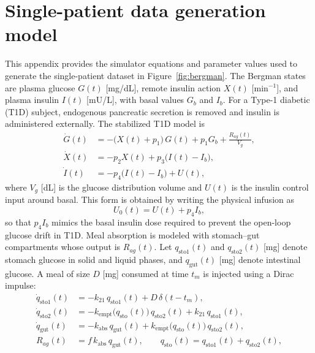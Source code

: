 \documentclass[preprint,12pt]{elsarticle}
\begin{document}
\section{Single-patient data generation model}
\label{app:bergman}
This appendix provides the simulator equations and parameter values used to generate the single-patient dataset in Figure~\ref{fig:bergman}.
%
The Bergman states are plasma glucose $G(t)$ [mg/dL], remote insulin action $X(t)$ [min$^{-1}$], and plasma insulin $I(t)$ [mU/L], with basal values $G_b$ and $I_b$. For a Type-1 diabetic (T1D) subject, endogenous pancreatic secretion is removed and insulin is administered externally. The stabilized T1D model is
\begin{align}
\dot G(t) &= -\big(X(t)+p_1\big)\,G(t) + p_1 G_b + \frac{R_{ag}(t)}{V_g}, \label{eq:t1d_bergman_G}\\
\dot X(t) &= -p_2 X(t) + p_3\big(I(t)-I_b\big), \label{eq:t1d_bergman_X}\\
\dot I(t) &= -p_4\big(I(t)-I_b\big) + U(t), \label{eq:t1d_bergman_I}
\end{align}
where $V_g$ [dL] is the glucose distribution volume and $U(t)$ is the insulin control input around basal. This form is obtained by writing the physical infusion as
\begin{equation}
U_0(t) = U(t) + p_4 I_b,
\end{equation}
so that $p_4 I_b$ mimics the basal insulin dose required to prevent the open-loop glucose drift in T1D.
%
Meal absorption is modeled with stomach--gut compartments whose output is $R_{ag}(t)$. Let $q_{\mathrm{sto}1}(t)$ and $q_{\mathrm{sto}2}(t)$ [mg] denote stomach glucose in solid and liquid phases, and $q_{\mathrm{gut}}(t)$ [mg] denote intestinal glucose. A meal of size $D$ [mg] consumed at time $t_m$ is injected using a Dirac impulse:
\begin{align}
\dot q_{\mathrm{sto}1}(t) &= -k_{21}\,q_{\mathrm{sto}1}(t) + D\,\delta(t-t_m), \label{eq:gut1}\\
\dot q_{\mathrm{sto}2}(t) &= -k_{\mathrm{empt}}\!\big(q_{\mathrm{sto}}(t)\big)\,q_{\mathrm{sto}2}(t) + k_{21}\,q_{\mathrm{sto}1}(t), \label{eq:gut2}\\
\dot q_{\mathrm{gut}}(t) &= -k_{\mathrm{abs}}\,q_{\mathrm{gut}}(t) + k_{\mathrm{empt}}\!\big(q_{\mathrm{sto}}(t)\big)\,q_{\mathrm{sto}2}(t), \label{eq:gut3}\\
R_{ag}(t) &= f\,k_{\mathrm{abs}}\,q_{\mathrm{gut}}(t), \qquad q_{\mathrm{sto}}(t)=q_{\mathrm{sto}1}(t)+q_{\mathrm{sto}2}(t), \label{eq:Ra}
\end{align}
\end{document}
